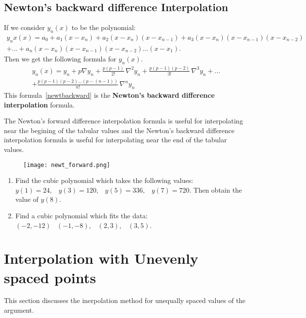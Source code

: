 \documentclass[aima203_lecturenotes_ku.tex]{subfiles}
\begin{document}
\subsection{Newton's backward difference Interpolation}
If we consider $y_n(x)$ to be the polynomial:
\begin{equation}
  \begin{gathered}
  y_nx(x)= a_0 +a_1(x-x_n) +a_2(x-x_n)(x-x_{n-1})+a_3(x-x_n)(x-x_{n-1})(x-x_{n-2}) \\[1mm]
  + ... + a_n(x-x_n)(x-x_{n-1})(x-x_{n-2})...(x-x_1).
  \end{gathered}
\end{equation}
Then we get the following formula for $y_n(x)$.
\begin{equation}
  \label{newtbackward}
 \begin{gathered}
  y_n(x) = y_n + p \nabla y_n + \frac{p(p-1)}{2!}\, \nabla ^2 y_n + \frac{p(p-1)(p-2)}{3!}\, \nabla ^3 y_n + ... \\[1mm]
  + \frac{p(p-1)(p-2)...(p-(n-1))}{n!}\, \nabla ^n y_n
\end{gathered}
\end{equation}
This formula~\ref{newtbackward} is the \textbf{Newton's backward difference interpolation} formula.

\begin{remark}
The Newton's forward difference interpolation formula is useful for interpolating near the begining of the tabular values and the Newton's backward difference interpolation formula is useful for interpolating near the end of the tabular values.
\end{remark}

\begin{figure}[h]
  \centering
\texttt{[image: newt\_forward.png]}
\end{figure}


\begin{enumerate}
\item Find the cubic polynomial which takes the following values: $y(1)=24, \;\;\;  y(3)=120,  \;\;\; y(5)=336,  \;\;\; y(7)=720$. Then obtain the value of $y(8)$.
\item Find a cubic polynomial which fits the data: $(-2, -12)  \;\;\; (-1, -8),  \;\;\; (2,3),  \;\;\; (3,5)$.
\end{enumerate}
\section{Interpolation with Unevenly spaced points}
This section discusses the inerpolation method for unequally spaced values of the argument.
\end{document}

